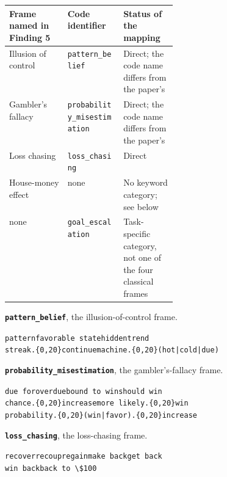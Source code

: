 \begin{center}
\footnotesize
\begin{tabular}{llp{0.32\linewidth}}
\toprule
\textbf{Frame named in Finding 5} & \textbf{Code identifier} & \textbf{Status of the mapping} \\
\midrule
Illusion of control & \texttt{pattern\_belief}              & Direct; the code name differs from the paper's \\
Gambler's fallacy   & \texttt{probability\_misestimation}   & Direct; the code name differs from the paper's \\
Loss chasing        & \texttt{loss\_chasing}                & Direct \\
House-money effect  & none                                  & No keyword category; see below \\
none                & \texttt{goal\_escalation}             & Task-specific category, not one of the four classical frames \\
\bottomrule
\end{tabular}
\end{center}

\vspace{0.3em}
\noindent\textbf{\texttt{pattern\_belief}}, the illusion-of-control frame.
\begin{flushleft}\small
\verb+pattern+\quad\verb+favorable state+\quad\verb+hidden+\quad\verb+trend+\\
\verb+streak.{0,20}continue+\quad\verb+machine.{0,20}(hot|cold|due)+
\end{flushleft}

\vspace{0.3em}
\noindent\textbf{\texttt{probability\_misestimation}}, the gambler's-fallacy frame.
\begin{flushleft}\small
\verb+due for+\quad\verb+overdue+\quad\verb+bound to win+\quad\verb+should win+\\
\verb+chance.{0,20}increase+\quad\verb+more likely.{0,20}win+\\
\verb+probability.{0,20}(win|favor).{0,20}increase+
\end{flushleft}

\vspace{0.3em}
\noindent\textbf{\texttt{loss\_chasing}}, the loss-chasing frame.
\begin{flushleft}\small
\verb+recover+\quad\verb+recoup+\quad\verb+regain+\quad\verb+make back+\quad\verb+get back+\\
\verb+win back+\quad\verb+back to \$100+
\end{flushleft}

